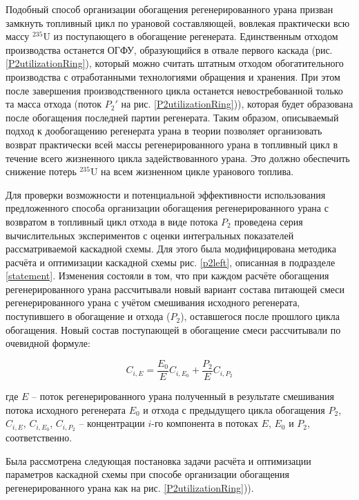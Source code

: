 {Подобный способ организации обогащения регенерированного урана призван замкнуть топливный цикл по урановой составляющей, вовлекая практически всю массу $^{235}$U из поступающего в обогащение регенерата. Единственным отходом производства останется ОГФУ, образующийся в отвале первого каскада (рис. \ref{P2utilizationRing}), который можно считать штатным отходом обогатительного производства с отработанными технологиями обращения и хранения. При этом после завершения производственного цикла останется невостребованной только та масса отхода (поток ${P_2}'$ на рис. \ref{P2utilizationRing})), которая будет образована после обогащения последней партии регенерата. Таким образом, описываемый подход к дообогащению регенерата урана в теории позволяет организовать возврат практически всей массы регенерированного урана в топливный цикл в течение всего жизненного цикла задействованного урана. Это должно обеспечить снижение потерь $^{235}$U на всем жизненном цикле уранового топлива.

Для проверки возможности и потенциальной эффективности использования предложенного способа организации обогащения регенерированного урана с возвратом в топливный цикл отхода в виде потока $P_2$ проведена серия вычислительных экспериментов с оценки интегральных показателей рассматриваемой каскадной схемы. Для этого была модифицирована методика расчёта и оптимизации каскадной схемы рис. \ref{p2left}, описанная в подразделе \ref{statement}. Изменения состояли в том, что при каждом расчёте обогащения регенерированного урана рассчитывали новый вариант состава питающей смеси регенерированного урана с учётом смешивания исходного регенерата, поступившего в обогащение и отхода ($P_2$), оставшегося после прошлого цикла обогащения. Новый состав поступающей в обогащение смеси рассчитывали по очевидной формуле:

\begin{equation} \label{Cie} 
    C_{i,E}=\frac{E_0}{E}{C_{i,{E_0}}} + \frac{P_2}{E}{C_{i,{P_2}}}
\end{equation}

где $E$ -- поток регенерированного урана полученный в результате смешивания потока исходного регенерата $E_0$ и отхода с предыдущего цикла обогащения $P_2$, $C_{i,E}$, $C_{i,{E_0}}$, $C_{i,{P_2}}$ -- концентрации $i$-го компонента в потоках $E$, $E_0$ и $P_2$, соответственно.     

Была рассмотрена следующая постановка задачи расчёта и оптимизации параметров каскадной схемы при способе организации обогащения регенерированного урана как на рис. \ref{P2utilizationRing})).

}
